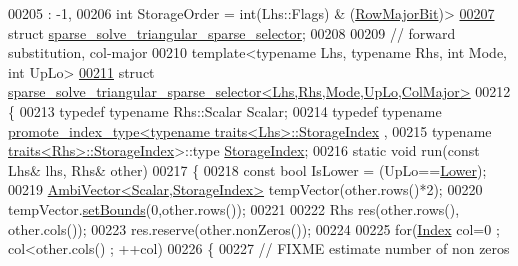 \begin{DoxyCode}
00205            : -1,
00206   \textcolor{keywordtype}{int} StorageOrder = int(Lhs::Flags) & (\hyperlink{group__flags_gae4f56c2a60bbe4bd2e44c5b19cbe8762}{RowMajorBit})>
\hyperlink{struct_eigen_1_1internal_1_1sparse__solve__triangular__sparse__selector}{00207} \textcolor{keyword}{struct} \hyperlink{struct_eigen_1_1internal_1_1sparse__solve__triangular__sparse__selector}{sparse\_solve\_triangular\_sparse\_selector};
00208 
00209 \textcolor{comment}{// forward substitution, col-major}
00210 \textcolor{keyword}{template}<\textcolor{keyword}{typename} Lhs, \textcolor{keyword}{typename} Rhs, \textcolor{keywordtype}{int} Mode, \textcolor{keywordtype}{int} UpLo>
\hyperlink{struct_eigen_1_1internal_1_1sparse__solve__triangular__sparse__selector_3_01_lhs_00_01_rhs_00_0103d70089ab1c1a5e4529163773532981}{00211} \textcolor{keyword}{struct }\hyperlink{struct_eigen_1_1internal_1_1sparse__solve__triangular__sparse__selector_3_01_lhs_00_01_rhs_00_0103d70089ab1c1a5e4529163773532981}{sparse\_solve\_triangular\_sparse\_selector<Lhs,Rhs,Mode,UpLo,ColMajor>}
00212 \{
00213   \textcolor{keyword}{typedef} \textcolor{keyword}{typename} Rhs::Scalar Scalar;
00214   \textcolor{keyword}{typedef} \textcolor{keyword}{typename} \hyperlink{struct_eigen_1_1internal_1_1promote__index__type}{promote\_index\_type<typename traits<Lhs>::StorageIndex}
      ,
00215                                       \textcolor{keyword}{typename} \hyperlink{struct_eigen_1_1internal_1_1traits}{traits<Rhs>::StorageIndex}>::type 
      \hyperlink{struct_eigen_1_1internal_1_1conditional}{StorageIndex};
00216   \textcolor{keyword}{static} \textcolor{keywordtype}{void} run(\textcolor{keyword}{const} Lhs& lhs, Rhs& other)
00217   \{
00218     \textcolor{keyword}{const} \textcolor{keywordtype}{bool} IsLower = (UpLo==\hyperlink{group__enums_gga39e3366ff5554d731e7dc8bb642f83cda891792b8ed394f7607ab16dd716f60e6}{Lower});
00219     \hyperlink{class_eigen_1_1internal_1_1_ambi_vector}{AmbiVector<Scalar,StorageIndex>} tempVector(other.rows()*2);
00220     tempVector.\hyperlink{class_eigen_1_1internal_1_1_ambi_vector_a8a37e06682a29a63239d914de342096c}{setBounds}(0,other.rows());
00221 
00222     Rhs res(other.rows(), other.cols());
00223     res.reserve(other.nonZeros());
00224 
00225     \textcolor{keywordflow}{for}(\hyperlink{namespace_eigen_a62e77e0933482dafde8fe197d9a2cfde}{Index} col=0 ; col<other.cols() ; ++col)
00226     \{
00227       \textcolor{comment}{// FIXME estimate number of non zeros}

\end{DoxyCode}

